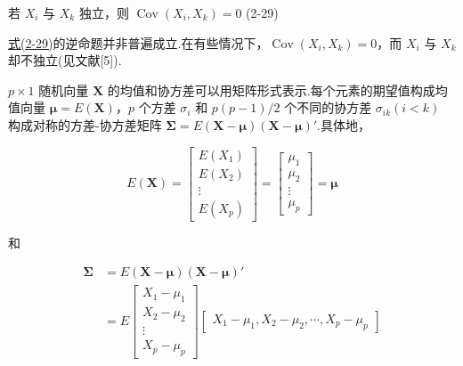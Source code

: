 \label{eq:2-29}
\begin{mvframe}
若 $X_i$ 与 $X_k$ 独立，则 $\operatorname{Cov}(X_i,X_k)=0$ \hfill (2-29)
\end{mvframe}

\hyperref[eq:2-29]{式(2-29)}的逆命题并非普遍成立.在有些情况下，$\operatorname{Cov}(X_i,X_k)=0$，而 $X_i$ 与 $X_k$ 却不独立(见文献[5]).

$p\times1$ 随机向量 $\bm{X}$ 的均值和协方差可以用矩阵形式表示.每个元素的期望值构成均值向量 $\bm{\mu}=E(\bm{X})$，$p$ 个方差 $\sigma_i$ 和 $p(p-1)/2$ 个不同的协方差 $\sigma_{ik}(i<k)$ 构成对称的方差-协方差矩阵 $\bm{\Sigma}=E(\bm{X}-\bm{\mu})(\bm{X}-\bm{\mu})'$.具体地，

\label{eq:2-30}
\begin{equation}
E(\bm{X})=
\begin{bmatrix}
E(X_1)\\
E(X_2)\\
\vdots\\
E(X_p)
\end{bmatrix}
=
\begin{bmatrix}
\mu_1\\
\mu_2\\
\vdots\\
\mu_p
\end{bmatrix}
=\bm{\mu} \tag{2-30}
\end{equation}

和

\[
\begin{aligned}
\bm{\Sigma}&=E(\bm{X}-\bm{\mu})(\bm{X}-\bm{\mu})'\\
&=E
\begin{bmatrix}
X_1-\mu_1\\
X_2-\mu_2\\
\vdots\\
X_p-\mu_p
\end{bmatrix}
\begin{bmatrix}
X_1-\mu_1,X_2-\mu_2,\cdots,X_p-\mu_p
\end{bmatrix}
\end{aligned}
\]
